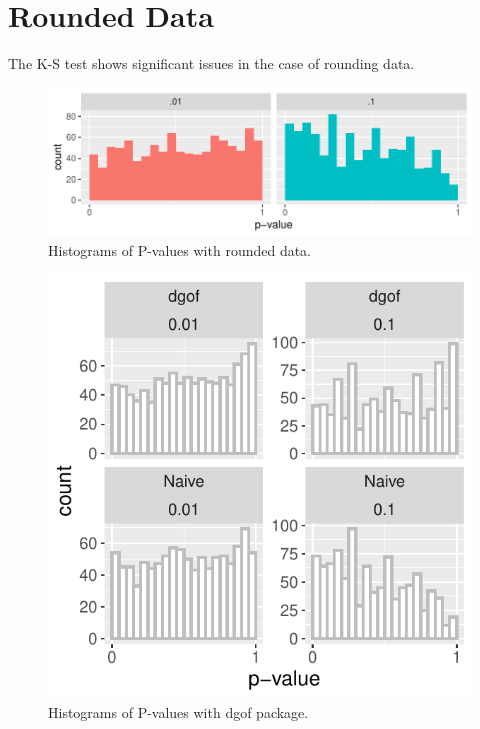 \documentclass[12pt, letterpaper, titlepage]{article}
\begin{document}
\hypertarget{sec:rounded}{%
\section{Rounded Data}\label{sec:rounded}}

The K-S test shows significant issues in the case of rounding data.

\begin{figure}[!ht]
  \centering
  \includegraphics[width=0.8\linewidth]{hist_rounded}
  \caption{Histograms of P-values with rounded data.}
  \label{fig:hist_rounded}
\end{figure}

\begin{figure}[!ht]
  \centering
  \includegraphics[width=0.8\linewidth]{hist_dgof}
  \caption{Histograms of P-values with dgof package.}
  \label{fig:hist_dgof}
\end{figure}
\end{document}
